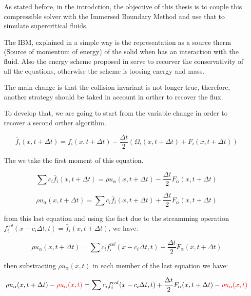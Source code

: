 As stated before, in the introdction, the objective of this thesis is to couple
this compressible solver with the Immersed Boundary Method and use that to
simulate supercritical fluids. 

The IBM, explained in a simple way is the representation as a source therm
(Source of momentum of energy) of the solid when has an interaction with the
fluid. Also the energy scheme proposed in \cite{wissocq2022restoring} serve to
recorver the conservativity of all the equations, otherwise the scheme is
loosing energy and mass.

The main change is that the collision invariant is not longer true, therefore,
another strategy should be taked in account in orther to recover the flux.

To develop that, we are going to start from the variable change in order to
recover a second orther algorithm.

\begin{equation}
	\bar{f}_i(x,t+\Delta t) = {f}_i(x,t+\Delta t) - \frac{\Delta t}{2}\left(\Omega_i(x,t+\Delta t) + F_i(x,t+\Delta t)\right) 
\end{equation}

The we take the first moment of this equation.

\begin{equation}
	\sum{c_i\bar{f}_i(x,t+\Delta t)} = \rho u_\alpha(x,t+\Delta t) - \frac{\Delta t}{2}F_\alpha(x,t+\Delta t)
\end{equation}

\begin{equation}
	\rho u_\alpha(x,t+\Delta t) = \sum{c_i\bar{f}_i(x,t+\Delta t)} + \frac{\Delta t}{2}F_\alpha(x,t+\Delta t)
\end{equation}

from this last equation and using the fact due to the streamming operation
$f_i^{col}(x-c_i\Delta t, t) = \bar{f}_i(x,t+\Delta t)$, we have:

\begin{equation}
	\rho u_\alpha(x,t+\Delta t) = \sum{c_i f_i^{col}(x-c_i\Delta t, t)} + \frac{\Delta t}{2}F_\alpha(x,t+\Delta t)
\end{equation}

then substracting $\rho u_\alpha(x,t)$ in each member of the last equation we have:

\begin{equation}
	\rho u_\alpha(x,t+\Delta t) -\textcolor{red}{\rho u_\alpha(x,t)}= \sum{c_i f_i^{col}(x-c_i\Delta t, t)} + \frac{\Delta t}{2}F_\alpha(x,t+\Delta t) -\textcolor{red}{\rho u_\alpha(x,t)}
\end{equation}

